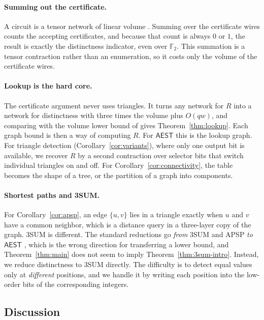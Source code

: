 \documentclass[11pt]{article}
\theoremstyle{definition}
\theoremstyle{remark}
\newcommand{\F}{\mathbb{F}}
\newcommand{\AEST}{\mathsf{AEST}}
\begin{document}
\paragraph{Summing out the certificate.} A circuit is a tensor network of
linear volume \cite{OAI,R06}. Summing over the certificate wires counts
the accepting certificates, and because that count is always $0$ or $1$,
the result is exactly the distinctness indicator, even over $\F_2$. This
summation is a tensor contraction rather than an enumeration, so it costs
only the volume of the certificate wires.

\paragraph{Lookup is the hard core.} The certificate argument never uses
triangles. It turns any network for $R$ into a network for distinctness
with three times the volume plus $O(qw)$, and comparing with the volume
lower bound of \cite{OAI} gives Theorem~\ref{thm:lookup}. Each graph bound
is then a way of computing $R$. For $\AEST$ this is the lookup graph. For
triangle detection (Corollary~\ref{cor:variants}), where only one output
bit is available, we recover $R$ by a second contraction over selector
bits that switch individual triangles on and off. For
Corollary~\ref{cor:connectivity}, the table becomes the shape of a tree,
or the partition of a graph into components.

\paragraph{Shortest paths and 3SUM.} For Corollary~\ref{cor:apsp}, an edge
$\{u,v\}$ lies in a triangle exactly when $u$ and $v$ have a common
neighbor, which is a distance query in a three-layer copy of the graph.
3SUM is different. The standard reductions go \emph{from} 3SUM and APSP
\emph{to} $\AEST$ \cite{VWX}, which is the wrong direction for
transferring a lower bound, and Theorem~\ref{thm:main} does not seem to
imply Theorem~\ref{thm:3sum-intro}. Instead, we reduce distinctness to
3SUM directly. The difficulty is to detect equal values only at
\emph{different} positions, and we handle it by writing each position into
the low-order bits of the corresponding integers.

\subsection{Discussion}
\end{document}
